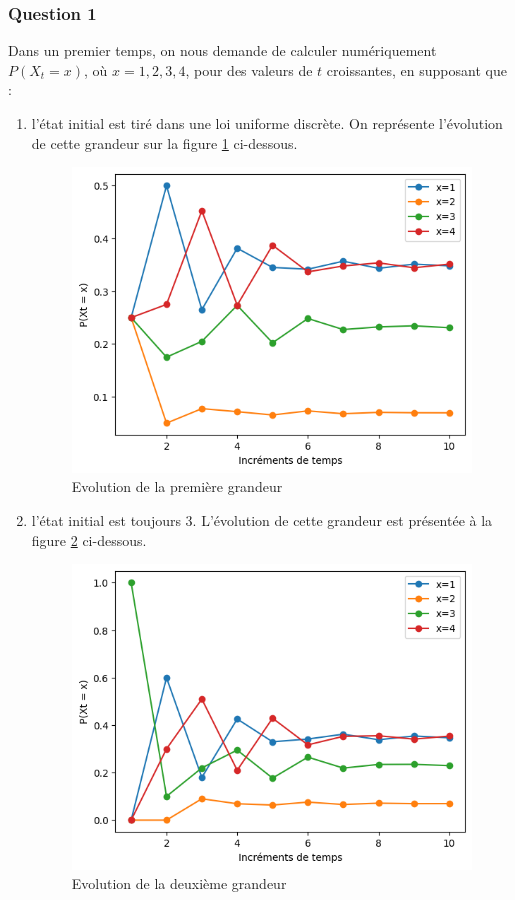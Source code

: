 \documentclass[a4paper, 11pt]{article}
\begin{document}
\subsubsection{Question 1}
Dans un premier temps, on nous demande de calculer  numériquement $P(X_t=x)$, où $x=1,2,3,4$, pour des valeurs de $t$ croissantes, en supposant que : 
\begin{enumerate}
    \item l'état initial est tiré dans une loi uniforme discrète. On représente l'évolution de cette grandeur sur la figure \ref{unif} ci-dessous.
    \begin{figure}[h!]
        \centering
        \includegraphics[scale=0.65]{evol_unif.png}
        \caption{Evolution de la première grandeur}
        \label{unif}
    \end{figure}
    \item l'état initial est toujours 3. L'évolution de cette grandeur est présentée à la figure \ref{trois} ci-dessous.
    \begin{figure}[h!]
        \centering
        \includegraphics[scale=0.65]{evol_trois.png}
        \caption{Evolution de la deuxième grandeur}
        \label{trois}
    \end{figure}
\end{enumerate}
\end{document}
